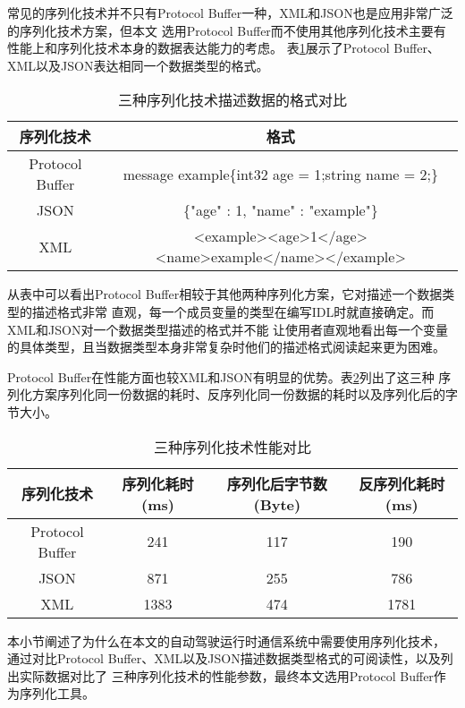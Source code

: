 常见的序列化技术并不只有Protocol Buffer一种，XML和JSON也是应用非常广泛的序列化技术方案，但本文
选用Protocol Buffer而不使用其他序列化技术主要有性能上和序列化技术本身的数据表达能力的考虑。
表\ref{serialize_tool_compare}展示了Protocol Buffer、XML以及JSON表达相同一个数据类型的格式。
\begin{table}[H]
  \centering\small
  \caption{三种序列化技术描述数据的格式对比\cite{6215346}}
  \label{serialize_tool_compare}
  \begin{tabular}{cc}
    \toprule
    序列化技术   &  格式                                       \\
    \midrule
    Protocol Buffer & message example\{int32 age = 1;string name = 2;\}  \\
    JSON & \{"age" : 1, "name" : "example"\}   \\
    XML & <example><age>1</age><name>example</name></example>       \\
    \bottomrule
  \end{tabular}
\end{table}
从表中可以看出Protocol Buffer相较于其他两种序列化方案，它对描述一个数据类型的描述格式非常
直观，每一个成员变量的类型在编写IDL时就直接确定。而XML和JSON对一个数据类型描述的格式并不能
让使用者直观地看出每一个变量的具体类型，且当数据类型本身非常复杂时他们的描述格式阅读起来更为困难。

Protocol Buffer在性能方面也较XML和JSON有明显的优势。表\ref{serialize_performance_compare}列出了这三种
序列化方案序列化同一份数据的耗时、反序列化同一份数据的耗时以及序列化后的字节大小\cite{proto}。
\begin{table}[H]
  \centering\small
  \caption{三种序列化技术性能对比}
  \label{serialize_performance_compare}
  \begin{tabular}{cccc}
    \toprule
    序列化技术 & 序列化耗时(ms) & 序列化后字节数(Byte) & 反序列化耗时(ms)                                       \\
    \midrule
    Protocol Buffer & 241 & 117 & 190 \\
    JSON & 871 & 255 & 786 \\
    XML & 1383 & 474 & 1781 \\
    \bottomrule
  \end{tabular}
\end{table}


本小节阐述了为什么在本文的自动驾驶运行时通信系统中需要使用序列化技术，
通过对比Protocol Buffer、XML以及JSON描述数据类型格式的可阅读性，以及列出实际数据对比了
三种序列化技术的性能参数，最终本文选用Protocol Buffer作为序列化工具。

